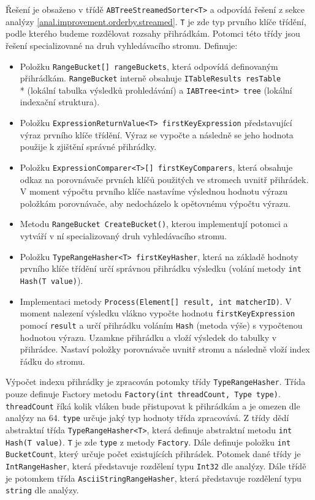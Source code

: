 Řešení je obsaženo v třídě \texttt{ABTreeStreamedSorter<T>} a odpovídá řešení z sekce analýzy \ref{anal.improvement.orderby.streamed}.
\texttt{T} je zde typ prvního klíče třídění, podle kterého budeme rozdělovat rozsahy přihrádkám.
Potomci této třídy jsou řešení specializované na druh vyhledávacího stromu.
Definuje:
\begin{itemize}
\item Položku \texttt{RangeBucket[] rangeBuckets}, která odpovídá definovaným přihrádkám.
\texttt{RangeBucket} interně obsahuje \texttt{ITableResults resTable}\\* (lokální tabulka výsledků prohledávání) a \texttt{IABTree<int> tree} (lokální indexační struktura).

\item Položku \texttt{ExpressionReturnValue<T> firstKeyExpression} představující výraz prvního klíče třídění.
Výraz se vypočte a následně se jeho hodnota použije k zjištění správné přihrádky.
\item Položku \texttt{ExpressionComparer<T>[] firstKeyComparers}, která obsahuje odkaz na porovnávače prvních klíčů použitých ve stromech uvnitř přihrádek.
V moment výpočtu prvního klíče nastavíme výslednou hodnotu výrazu položkám porovnávače, aby nedocházelo k opětovnému výpočtu výrazu.
\item Metodu \texttt{RangeBucket CreateBucket()}, kterou implementují potomci a vytváří v ní specializovaný druh vyhledávacího stromu.
\item Položku \texttt{TypeRangeHasher<T> firstKeyHasher}, která na základě hodnoty prvního klíče třídění určí správnou přihrádku výsledku (volání metody \texttt{int Hash(T value)}).
\item Implementaci metody \texttt{Process(Element[] result, int matcherID)}.
V moment nalezení výsledku vlákno vypočte hodnotu \texttt{firstKeyExpression} pomocí \texttt{result} a určí přihrádku voláním \texttt{Hash} (metoda výše) s vypočtenou hodnotou výrazu.
Uzamkne přihrádku a vloží výsledek do tabulky v přihrádce.
Nastaví položky porovnávače uvnitř stromu a následně vloží index řádku do stromu. 
\end{itemize}
Výpočet indexu přihrádky je zpracován potomky třídy \texttt{TypeRangeHasher}.
Třída pouze definuje Factory metodu \citep[str. 107]{patterns} \texttt{Factory(int threadCount, Type type)}.
\texttt{threadCount} říká kolik vláken bude přistupovat k přihrádkám a je omezen dle analýzy na 64.
\texttt{type} určuje jaký typ hodnoty třída zpracovává.
Z třídy dědí abstraktní třída \texttt{TypeRangeHasher<T>}, která definuje abstraktní metodu \texttt{int Hash(T value)}.
\texttt{T} je zde \texttt{type} z metody \texttt{Factory}.
Dále definuje položku \texttt{int BucketCount}, který určuje počet existujících přihrádek.
Potomek dané třídy je \texttt{IntRangeHasher}, která představuje rozdělení typu \texttt{Int32} dle analýzy.
Dále třídě je potomkem třída \texttt{AsciiStringRangeHasher}, která představuje rozdělení typu \texttt{string} dle analýzy.

